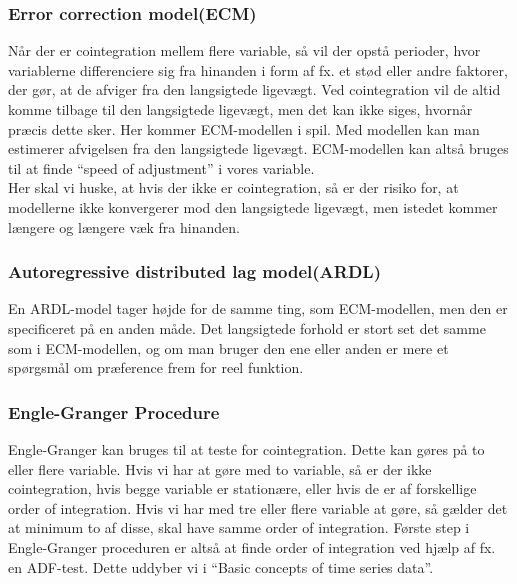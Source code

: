 \documentclass[
  10pt,
]{article}
\begin{document}
\hypertarget{error-correction-modelecm}{%
\subsubsection{Error correction
model(ECM)}\label{error-correction-modelecm}}

Når der er cointegration mellem flere variable, så vil der opstå
perioder, hvor variablerne differenciere sig fra hinanden i form af fx.
et stød eller andre faktorer, der gør, at de afviger fra den langsigtede
ligevægt. Ved cointegration vil de altid komme tilbage til den
langsigtede ligevægt, men det kan ikke siges, hvornår præcis dette sker.
Her kommer ECM-modellen i spil. Med modellen kan man estimerer
afvigelsen fra den langsigtede ligevægt. ECM-modellen kan altså bruges
til at finde ``speed of adjustment'' i vores variable.\\

Her skal vi huske, at hvis der ikke er cointegration, så er der risiko
for, at modellerne ikke konvergerer mod den langsigtede ligevægt, men
istedet kommer længere og længere væk fra hinanden.

\hypertarget{autoregressive-distributed-lag-modelardl}{%
\subsubsection{Autoregressive distributed lag
model(ARDL)}\label{autoregressive-distributed-lag-modelardl}}

En ARDL-model tager højde for de samme ting, som ECM-modellen, men den
er specificeret på en anden måde. Det langsigtede forhold er stort set
det samme som i ECM-modellen, og om man bruger den ene eller anden er
mere et spørgsmål om præference frem for reel funktion.

\hypertarget{engle-granger-procedure}{%
\subsubsection{Engle-Granger Procedure}\label{engle-granger-procedure}}

Engle-Granger kan bruges til at teste for cointegration. Dette kan gøres
på to eller flere variable. Hvis vi har at gøre med to variable, så er
der ikke cointegration, hvis begge variable er stationære, eller hvis de
er af forskellige order of integration. Hvis vi har med tre eller flere
variable at gøre, så gælder det at minimum to af disse, skal have samme
order of integration. Første step i Engle-Granger proceduren er altså at
finde order of integration ved hjælp af fx. en ADF-test. Dette uddyber
vi i ``Basic concepts of time series data''.\\
\end{document}

